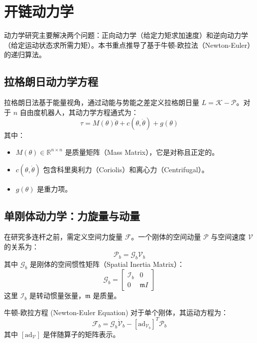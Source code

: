 \chapter{开链动力学}

动力学研究主要解决两个问题：正向动力学（给定力矩求加速度）和逆向动力学（给定运动状态求所需力矩）。本书重点推导了基于牛顿-欧拉法（Newton-Euler）的递归算法。

\section{拉格朗日动力学方程}
拉格朗日法基于能量视角，通过动能与势能之差定义拉格朗日量 $L = \mathcal{K} - \mathcal{P}$。对于 $n$ 自由度机器人，其动力学方程通式为：
\begin{equation}
    \tau = M(\theta)\ddot{\theta} + c(\theta, \dot{\theta}) + g(\theta)
\end{equation}
其中：
\begin{itemize}
    \item $M(\theta) \in \mathbb{R}^{n \times n}$ 是质量矩阵（Mass Matrix），它是对称且正定的。
    \item $c(\theta, \dot{\theta})$ 包含科里奥利力（Coriolis）和离心力（Centrifugal）。
    \item $g(\theta)$ 是重力项。
\end{itemize}



\section{单刚体动力学：力旋量与动量}
在研究多连杆之前，需定义空间力旋量 $\mathcal{F}$。一个刚体的空间动量 $\mathcal{P}$ 与空间速度 $\mathcal{V}$ 的关系为：
\begin{equation}
    \mathcal{P}_b = \mathcal{G}_b \mathcal{V}_b
\end{equation}
其中 $\mathcal{G}_b$ 是刚体的空间惯性矩阵（Spatial Inertia Matrix）：
\begin{equation}
    \mathcal{G}_b = \begin{bmatrix} \mathcal{I}_b & 0 \\ 0 & \mathfrak{m}I \end{bmatrix}
\end{equation}
这里 $\mathcal{I}_b$ 是转动惯量张量，$\mathfrak{m}$ 是质量。

\begin{defbox}{牛顿-欧拉方程 (Newton-Euler Equation)}
对于单个刚体，其运动方程为：
\begin{equation}
    \mathcal{F}_b = \mathcal{G}_b \dot{\mathcal{V}}_b - [\text{ad}_{\mathcal{V}_b}]^T \mathcal{P}_b
\end{equation}
其中 $[\text{ad}_{\mathcal{V}}]$ 是伴随算子的矩阵表示。
\end{defbox}

